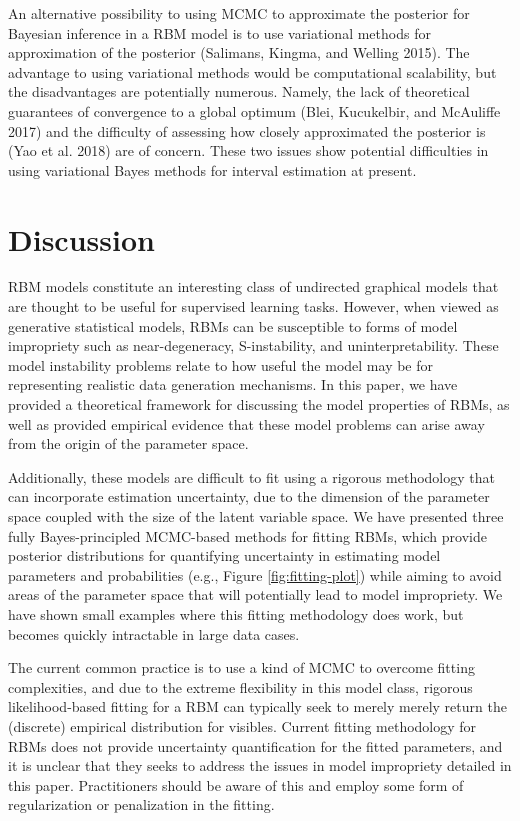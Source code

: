 \documentclass[AMS,STIX1COL]{WileyNJD-v2}
\begin{document}
An alternative possibility to using MCMC to approximate the posterior
for Bayesian inference in a RBM model is to use variational methods for
approximation of the posterior (Salimans, Kingma, and Welling 2015). The
advantage to using variational methods would be computational
scalability, but the disadvantages are potentially numerous. Namely, the
lack of theoretical guarantees of convergence to a global optimum (Blei,
Kucukelbir, and McAuliffe 2017) and the difficulty of assessing how
closely approximated the posterior is (Yao et al. 2018) are of concern.
These two issues show potential difficulties in using variational Bayes
methods for interval estimation at present.

\hypertarget{discussion}{%
\section{Discussion}\label{discussion}}

RBM models constitute an interesting class of undirected graphical
models that are thought to be useful for supervised learning tasks.
However, when viewed as generative statistical models, RBMs can be
susceptible to forms of model impropriety such as near-degeneracy,
S-instability, and uninterpretability. These model instability problems
relate to how useful the model may be for representing realistic data
generation mechanisms. In this paper, we have provided a theoretical
framework for discussing the model properties of RBMs, as well as
provided empirical evidence that these model problems can arise away
from the origin of the parameter space.

Additionally, these models are difficult to fit using a rigorous
methodology that can incorporate estimation uncertainty, due to the
dimension of the parameter space coupled with the size of the latent
variable space. We have presented three fully Bayes-principled
MCMC-based methods for fitting RBMs, which provide posterior
distributions for quantifying uncertainty in estimating model parameters
and probabilities (e.g., Figure \ref{fig:fitting-plot}) while aiming to
avoid areas of the parameter space that will potentially lead to model
impropriety. We have shown small examples where this fitting methodology
does work, but becomes quickly intractable in large data cases.

The current common practice is to use a kind of MCMC to overcome fitting
complexities, and due to the extreme flexibility in this model class,
rigorous likelihood-based fitting for a RBM can typically seek to merely
merely return the (discrete) empirical distribution for visibles.
Current fitting methodology for RBMs does not provide uncertainty
quantification for the fitted parameters, and it is unclear that they
seeks to address the issues in model impropriety detailed in this paper.
Practitioners should be aware of this and employ some form of
regularization or penalization in the fitting.
\end{document}
